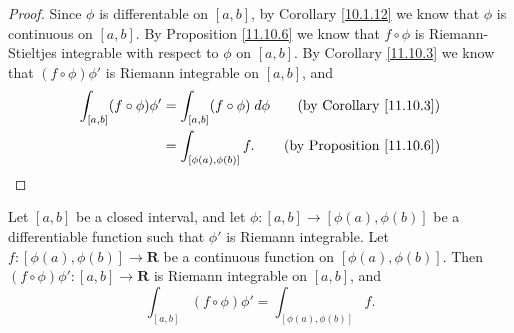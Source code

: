\begin{proof}
    Since \(\phi\) is differentable on \([a, b]\), by Corollary \ref{10.1.12} we know that \(\phi\) is continuous on \([a, b]\).
    By Proposition \ref{11.10.6} we know that \(f \circ \phi\) is Riemann-Stieltjes integrable with respect to \(\phi\) on \([a, b]\).
    By Corollary \ref{11.10.3} we know that \((f \circ \phi) \phi'\) is Riemann integrable on \([a, b]\), and
    \begin{align*}
        \int_{[a, b]} (f \circ \phi) \phi' & = \int_{[a, b]} (f \circ \phi) \; d \phi & \text{(by Corollary \ref{11.10.3})}   \\
                                           & = \int_{[\phi(a), \phi(b)]} f.           & \text{(by Proposition \ref{11.10.6})}
    \end{align*}
\end{proof}

\begin{additional corollary}\label{ac 11.10.1}
Let \([a, b]\) be a closed interval, and let \(\phi : [a, b] \to [\phi(a), \phi(b)]\) be a differentiable function such that \(\phi'\) is Riemann integrable.
Let \(f : [\phi(a), \phi(b)] \to \mathbf{R}\) be a continuous function on \([\phi(a), \phi(b)]\).
Then \((f \circ \phi) \phi' : [a, b] \to \mathbf{R}\) is Riemann integrable on \([a, b]\), and
\[
    \int_{[a, b]} (f \circ \phi) \phi' = \int_{[\phi(a), \phi(b)]} f.
\]
\end{additional corollary}

